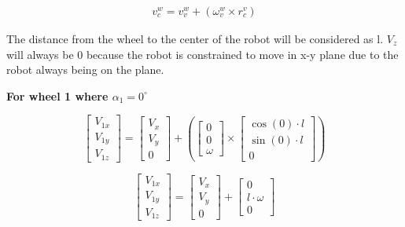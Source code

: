 \documentclass[answers]{exam}
\begin{document}
\begin{questions}
\begin{solution}
            \begin{align*}
                v^w_c = v^w_v + ({\omega}^w_v \times r^v_c)
            \end{align*}

            The distance from the wheel to the center of the robot will be considered as l.
            $V_z$ will always be 0 because the robot is constrained to move in x-y plane
            due to the robot always being on the plane.

            \textbf{For wheel 1 where $\alpha_1 = 0^\circ$}

            \begin{equation*}
                \begin{bmatrix}
                    V_{1x} \\
                    V_{1y} \\
                    V_{1z}
                \end{bmatrix}
                = \begin{bmatrix}
                    V_x \\
                    V_y \\
                    0
                \end{bmatrix}
                + \left(\begin{bmatrix}
                    0 \\
                    0 \\
                    \omega
                \end{bmatrix} \times \begin{bmatrix}
                    \cos(0) \cdot l \\
                    \sin(0) \cdot l \\
                    0
                \end{bmatrix}\right)
            \end{equation*}

            \begin{equation*}
                \begin{bmatrix}
                    V_{1x} \\
                    V_{1y} \\
                    V_{1z}
                \end{bmatrix}
                = \begin{bmatrix}
                    V_x \\
                    V_y \\
                    0
                \end{bmatrix}
                + \begin{bmatrix}
                    0              \\
                    l \cdot \omega \\
                    0
                \end{bmatrix}
            \end{equation*}


\end{solution}
\end{questions}
\end{document}
